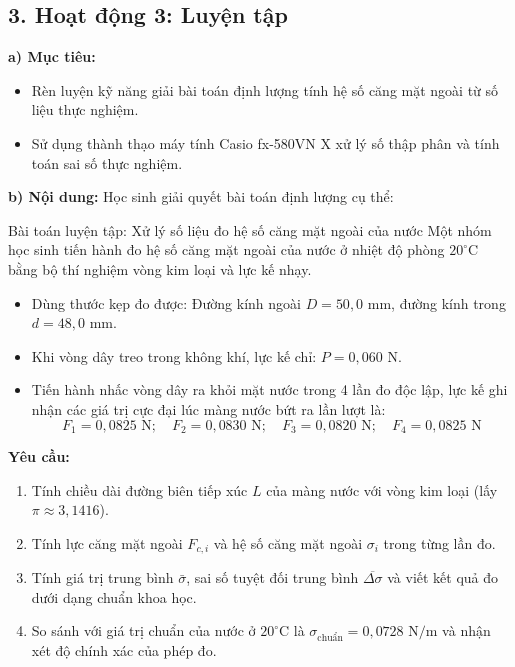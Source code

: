 \documentclass[12pt, a4paper]{article}
\begin{document}
\subsection*{3. Hoạt động 3: Luyện tập}

\noindent \textbf{a) Mục tiêu:}
\begin{itemize}
    \item Rèn luyện kỹ năng giải bài toán định lượng tính hệ số căng mặt ngoài từ số liệu thực nghiệm.
    \item Sử dụng thành thạo máy tính Casio fx-580VN X xử lý số thập phân và tính toán sai số thực nghiệm.
\end{itemize}

\noindent \textbf{b) Nội dung:}
Học sinh giải quyết bài toán định lượng cụ thể:

\begin{pedabox}{Bài toán luyện tập: Xử lý số liệu đo hệ số căng mặt ngoài của nước}
    Một nhóm học sinh tiến hành đo hệ số căng mặt ngoài của nước ở nhiệt độ phòng $20^\circ\text{C}$ bằng bộ thí nghiệm vòng kim loại và lực kế nhạy.
    \begin{itemize}
        \item Dùng thước kẹp đo được: Đường kính ngoài $D = 50{,}0\text{ mm}$, đường kính trong $d = 48{,}0\text{ mm}$.
        \item Khi vòng dây treo trong không khí, lực kế chỉ: $P = 0{,}060\text{ N}$.
        \item Tiến hành nhấc vòng dây ra khỏi mặt nước trong 4 lần đo độc lập, lực kế ghi nhận các giá trị cực đại lúc màng nước bứt ra lần lượt là:
        $$F_1 = 0{,}0825\text{ N}; \quad F_2 = 0{,}0830\text{ N}; \quad F_3 = 0{,}0820\text{ N}; \quad F_4 = 0{,}0825\text{ N}$$
    \end{itemize}
    \textbf{Yêu cầu:}
    \begin{enumerate}
        \item Tính chiều dài đường biên tiếp xúc $L$ của màng nước với vòng kim loại (lấy $\pi \approx 3{,}1416$).
        \item Tính lực căng mặt ngoài $F_{c, i}$ và hệ số căng mặt ngoài $\sigma_i$ trong từng lần đo.
        \item Tính giá trị trung bình $\bar{\sigma}$, sai số tuyệt đối trung bình $\overline{\Delta \sigma}$ và viết kết quả đo dưới dạng chuẩn khoa học.
        \item So sánh với giá trị chuẩn của nước ở $20^\circ\text{C}$ là $\sigma_{\text{chuẩn}} = 0{,}0728\text{ N/m}$ và nhận xét độ chính xác của phép đo.
    \end{enumerate}
\end{pedabox}
\end{document}

